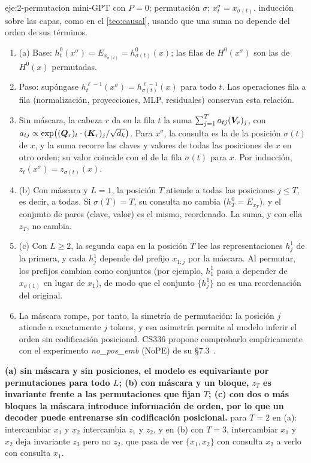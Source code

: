 \begin{solucion}{eje:2-permutacion}
\datos mini-GPT con $P=0$; permutación $\sigma$; $x^{\sigma}_t=x_{\sigma(t)}$.
\planteamiento inducción sobre las capas, como en el \cref{teo:causal}, usando que una suma no depende del orden de sus términos.
\pasos
\begin{enumerate}[label=\arabic*.]
  \item (a) Base: $h^{0}_t(x^{\sigma})=E_{x_{\sigma(t)}}=h^{0}_{\sigma(t)}(x)$; las filas de $H^{0}(x^{\sigma})$ son las de $H^{0}(x)$ permutadas.
  \item Paso: supóngase $h^{\ell-1}_t(x^{\sigma})=h^{\ell-1}_{\sigma(t)}(x)$ para todo $t$. Las operaciones fila a fila (normalización, proyecciones, MLP, residuales) conservan esta relación.
  \item Sin máscara, la cabeza $r$ da en la fila $t$ la suma $\sum_{j=1}^{T}a_{tj}(\bm{V}_r)_j$, con $a_{tj}\propto\exp\bigl((\bm{Q}_r)_t\cdot(\bm{K}_r)_j/\sqrt{d_k}\bigr)$. Para $x^{\sigma}$, la consulta es la de la posición $\sigma(t)$ de $x$, y la suma recorre las claves y valores de todas las posiciones de $x$ en otro orden; su valor coincide con el de la fila $\sigma(t)$ para $x$. Por inducción, $z_t(x^{\sigma})=z_{\sigma(t)}(x)$.
  \item (b) Con máscara y $L=1$, la posición $T$ atiende a todas las posiciones $j\le T$, es decir, a todas. Si $\sigma(T)=T$, su consulta no cambia ($h^{0}_T=E_{x_T}$), y el conjunto de pares (clave, valor) es el mismo, reordenado. La suma, y con ella $z_T$, no cambia.
  \item (c) Con $L\ge 2$, la segunda capa en la posición $T$ lee las representaciones $h^{1}_j$ de la primera, y cada $h^{1}_j$ depende del prefijo $x_{1:j}$ por la máscara. Al permutar, los prefijos cambian como conjuntos (por ejemplo, $h^{1}_1$ pasa a depender de $x_{\sigma(1)}$ en lugar de $x_1$), de modo que el conjunto $\{h^{1}_j\}$ no es una reordenación del original.
  \item La máscara rompe, por tanto, la simetría de permutación: la posición $j$ atiende a exactamente $j$ tokens, y esa asimetría permite al modelo inferir el orden sin codificación posicional. CS336 propone comprobarlo empíricamente con el experimento \emph{no\_pos\_emb} (NoPE) de su §7.3~\cite{cs336}.
\end{enumerate}
\resultado \textbf{(a) sin máscara y sin posiciones, el modelo es equivariante por permutaciones para todo $L$; (b) con máscara y un bloque, $z_T$ es invariante frente a las permutaciones que fijan $T$; (c) con dos o más bloques la máscara introduce información de orden, por lo que un decoder puede entrenarse sin codificación posicional.}
\comprobacion para $T=2$ en (a): intercambiar $x_1$ y $x_2$ intercambia $z_1$ y $z_2$, y en (b) con $T=3$, intercambiar $x_1$ y $x_2$ deja invariante $z_3$ pero no $z_2$, que pasa de ver $\{x_1,x_2\}$ con consulta $x_2$ a verlo con consulta $x_1$.
\end{solucion}

